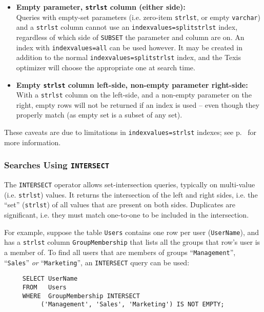 \begin{itemize}
  \item {\bf Empty parameter, \verb`strlst` column (either side):} \\
    Queries with empty-set parameters (i.e. zero-item \verb`strlst`,
    or empty \verb`varchar`) and a \verb`strlst` column cannot use an
    \verb`indexvalues=splitstrlst` index, regardless of which side of
    {\tt SUBSET} the parameter and column are on.  An index with
    \verb`indexvalues=all` can be used however.  It may be created in
    addition to the normal \verb`indexvalues=splitstrlst` index, and
    the Texis optimizer will choose the appropriate one at search
    time.

  \item {\bf Empty \verb`strlst` column left-side, non-empty parameter
    right-side:} \\
    With a \verb`strlst` column on the left-side, and a non-empty
    parameter on the right, empty rows will not be returned if an
    index is used -- even though they properly match (as empty set is
    a subset of any set).
\end{itemize}

These caveats are due to limitations in \verb`indexvalues=strlst`
indexes; see p.~\pageref{indexvalues} for more information.

\subsubsection{Searches Using {\tt INTERSECT}}
\label{IntersectOperator}

  The {\tt INTERSECT} operator allows set-intersection queries,
typically on multi-value (i.e. \verb`strlst`) values.  It returns the
intersection of the left and right sides, i.e. the ``set''
(\verb`strlst`) of all values that are present on both sides.
Duplicates are significant, i.e. they must match one-to-one to be
included in the intersection.

  For example, suppose the table \verb`Users` contains one row per
user (\verb`UserName`), and has a \verb`strlst` column
\verb`GroupMembership` that lists all the groups that row's user is a
member of.  To find all users that are members of groups
``\verb`Management`'', ``\verb`Sales`'' {\em or} ``\verb`Marketing`'',
an {\tt INTERSECT} query can be used:

\begin{verbatim}
     SELECT UserName
     FROM   Users
     WHERE  GroupMembership INTERSECT
          ('Management', 'Sales', 'Marketing') IS NOT EMPTY;
\end{verbatim}

